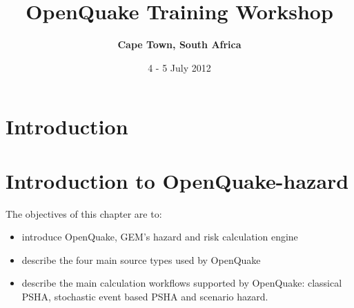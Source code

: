 \documentclass[11pt,a4paper,headings=small,dvips]{scrbook}
\newenvironment{myfancybox}{%
  \def\FrameCommand{\fboxsep=\FrameSep \fcolorbox{blue01}{honeydew}}%
  \color{black}\MakeFramed {\FrameRestore}}%
 {\endMakeFramed}
\begin{document}
\setcounter{page}{1}

\begin{titlepage}
	\title{ \textcolor{blue01}{\textsf{\bfseries\Huge 
        OpenQuake Training Workshop\\
        }}}
	\subtitle{ \textcolor{blue01}{\textsf{\bfseries\LARGE
        Cape Town, South Africa}}}
	\date{4 - 5 July 2012}
 
	\publishers{GEM Foundation, Pavia}
\end{titlepage}

\pagestyle{scrheadings}
\maketitle
\renewcommand*\thesection{\arabic{section}}
\renewcommand*\thefigure{\thesection.\arabic{figure}}
\clearpage
\chapter*{Introduction}
\cleardoublepage
\tableofcontents
\cleardoublepage
\chapter{Introduction to OpenQuake-hazard}
\begin{myfancybox}
The objectives of this chapter are to:
\begin{itemize}
    \item introduce OpenQuake, GEM's hazard and risk calculation engine
    \item describe the four main source types used by OpenQuake 
    \item describe the main calculation workflows supported by OpenQuake: 
        classical PSHA, stochastic event based PSHA and scenario hazard.
\end{itemize}
\end{myfancybox}
    
\end{document}
